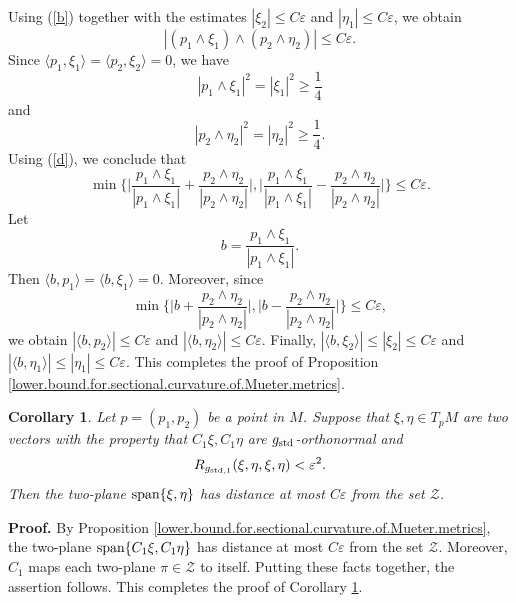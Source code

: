 \documentclass[11pt]{amsart}
\newtheorem{corollary}[theorem]{Corollary}
\theoremstyle{definition}
\begin{document}
Using (\ref{b}) together with the estimates $|\xi_2| \leq C\varepsilon$ and $|\eta_1| \leq C\varepsilon$, we obtain 
\begin{equation}
\label{d}
|(p_1 \wedge \xi_1) \wedge (p_2 \wedge \eta_2)| \leq C\varepsilon. 
\end{equation}
Since $\langle p_1,\xi_1 \rangle = \langle p_2,\xi_2 \rangle = 0$, we have 
\[|p_1 \wedge \xi_1|^2 = |\xi_1|^2 \geq \frac{1}{4}\] 
and 
\[|p_2 \wedge \eta_2|^2 = |\eta_2|^2 \geq \frac{1}{4}.\]
Using (\ref{d}), we conclude that 
\[\min \Big \{ \Big | \frac{p_1 \wedge \xi_1}{|p_1 \wedge \xi_1|} + \frac{p_2 \wedge \eta_2}{|p_2 \wedge \eta_2|} \Big |,\Big | \frac{p_1 \wedge \xi_1}{|p_1 \wedge \xi_1|} - \frac{p_2 \wedge \eta_2}{|p_2 \wedge \eta_2|} \Big | \Big \} \leq C\varepsilon.\] 
Let 
\[b = \frac{p_1 \wedge \xi_1}{|p_1 \wedge \xi_1|}.\] 
Then $\langle b,p_1 \rangle = \langle b,\xi_1 \rangle = 0$. Moreover, since 
\[\min \Big \{ \Big | b + \frac{p_2 \wedge \eta_2}{|p_2 \wedge \eta_2|} \Big |,\Big | b - \frac{p_2 \wedge \eta_2}{|p_2 \wedge \eta_2|} \Big | \Big \} \leq C\varepsilon,\] 
we obtain $|\langle b,p_2 \rangle| \leq C\varepsilon$ and $|\langle b,\eta_2 \rangle| \leq C\varepsilon$. Finally, $|\langle b,\xi_2 \rangle| \leq |\xi_2| \leq C\varepsilon$ and $|\langle b,\eta_1 \rangle| \leq |\eta_1| \leq C\varepsilon$. This completes the proof of Proposition \ref{lower.bound.for.sectional.curvature.of.Mueter.metrics}. \\


\begin{corollary} 
\label{lower.bound.for.sectional.curvature.of.Mueter.metrics.2}
Let $p = (p_1,p_2)$ be a point in $M$. Suppose that $\xi,\eta \in T_p M$ are two vectors with the property that $C_1\xi,C_1\eta$ are $g_{\text{\rm std}}$-orthonormal and 
\[R_{g_{\text{\rm std},1}}(\xi,\eta,\xi,\eta) < \varepsilon^2.\] 
Then the two-plane $\text{\rm span}\{\xi,\eta\}$ has distance at most $C\varepsilon$ from the set $\mathcal{Z}$.
\end{corollary}

\textbf{Proof.}
By Proposition \ref{lower.bound.for.sectional.curvature.of.Mueter.metrics}, the two-plane $\text{\rm span}\{C_1 \xi,C_1 \eta\}$ has distance at most $C\varepsilon$ from the set $\mathcal{Z}$. Moreover, $C_1$ maps each two-plane $\pi \in \mathcal{Z}$ to itself. Putting these facts together, the assertion follows. This completes the proof of Corollary \ref{lower.bound.for.sectional.curvature.of.Mueter.metrics.2}. \\
\end{document}
